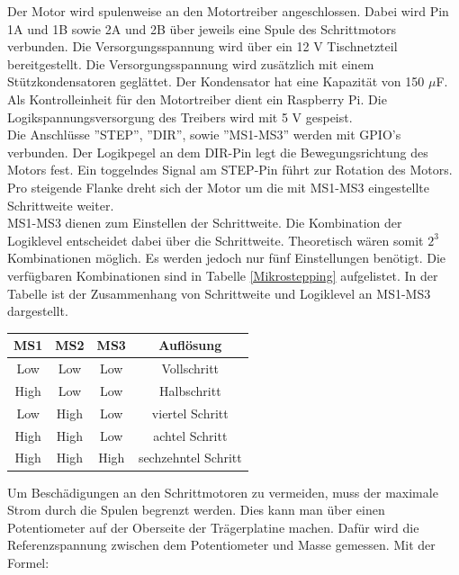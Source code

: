 Der Motor wird spulenweise an den Motortreiber angeschlossen. Dabei wird Pin 1A und 1B sowie 2A und 2B über jeweils eine Spule des Schrittmotors verbunden.
Die Versorgungsspannung wird über ein 12 V Tischnetzteil bereitgestellt. Die Versorgungsspannung wird zusätzlich mit einem Stützkondensatoren geglättet. Der Kondensator hat eine Kapazität von 150 $\mu$F.
Als Kontrolleinheit für den Motortreiber dient ein Raspberry Pi. Die Logikspannungsversorgung des Treibers wird mit 5 V gespeist.\\ 
Die Anschlüsse ''STEP'', ''DIR'', sowie ''MS1-MS3'' werden mit \ac{GPIO}’s verbunden. Der Logikpegel an dem DIR-Pin legt die Bewegungsrichtung des Motors fest. Ein toggelndes Signal am STEP-Pin führt zur Rotation des Motors. Pro steigende Flanke dreht sich der Motor um die mit MS1-MS3 eingestellte Schrittweite weiter. \\  
MS1-MS3 dienen zum Einstellen der Schrittweite. Die Kombination der Logiklevel entscheidet dabei über die Schrittweite. Theoretisch wären somit $2^{3}$ Kombinationen möglich. Es werden jedoch nur fünf Einstellungen benötigt. Die verfügbaren Kombinationen sind in Tabelle \ref{Mikrostepping} aufgelistet. In der Tabelle ist der Zusammenhang von Schrittweite und Logiklevel an MS1-MS3 dargestellt. 


\begin{center}
	\begin{tabular} [H] {|c|c|c|c|}
		\hline
		\textbf{MS1} & \textbf{MS2}	& \textbf{MS3} 		& \textbf{Auflösung} \\ \hline
		Low & Low	& Low		& Vollschritt\\ \hline
		High & Low 	& Low  		& Halbschritt	\\ \hline
		Low & High  & Low 		& viertel Schritt 	\\ \hline
		High & High	& Low 		& achtel Schritt 	\\ \hline
		High & High	 &  High	& sechzehntel Schritt	\\\hline
	
		\end {tabular}
		\label{Mikrostepping}
	\end{center}



Um Beschädigungen an den Schrittmotoren zu vermeiden, muss der maximale Strom durch die Spulen begrenzt werden. Dies kann man über einen Potentiometer auf der Oberseite der Trägerplatine machen. Dafür wird die Referenzspannung zwischen dem Potentiometer und Masse gemessen. Mit der Formel: 

